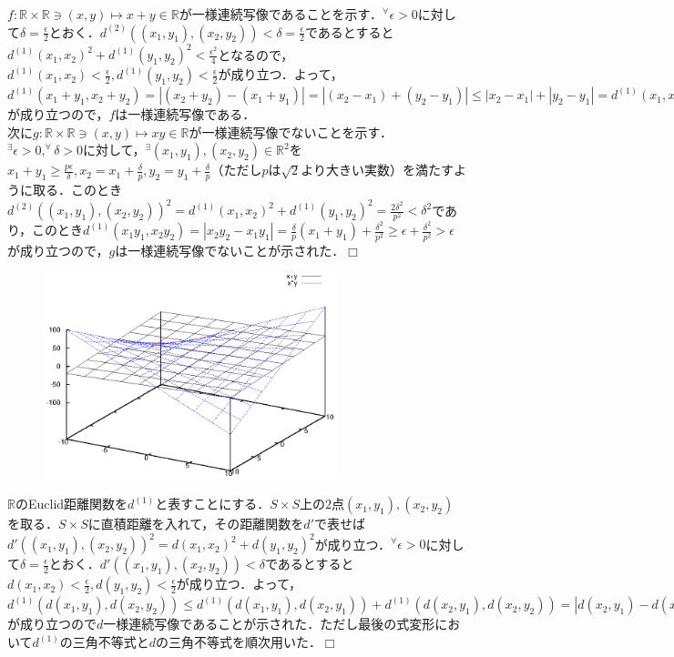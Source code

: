 ﻿\documentclass[11pt,a4paper]{jsarticle}
\def\qed{\hfill $\Box$}
\begin{document}
%
\prob
$f:\mathbb{R}\times\mathbb{R}\ni(x,y)\mapsto x+y \in \mathbb{R}$が一様連続写像であることを示す．$^\forall \epsilon>0$に対して$\delta=\frac{\epsilon}{2}$とおく．$d^{(2)}((x_1,y_1),(x_2,y_2))<\delta=\frac{\epsilon}{2}$であるとすると$d^{(1)}(x_1,x_2)^2+d^{(1)}(y_1,y_2)^2<\frac{\epsilon^2}{4}$となるので，$d^{(1)}(x_1,x_2)<\frac{\epsilon}{2},d^{(1)}(y_1,y_2)<\frac{\epsilon}{2}$が成り立つ．よって，$d^{(1)}(x_1+y_1,x_2+y_2)=|(x_2+y_2)-(x_1+y_1)|=|(x_2-x_1)+(y_2-y_1)|\leq|x_2-x_1|+|y_2-y_1|=d^{(1)}(x_1,x_2)+d^{(1)}(y_1,y_2)<\epsilon$が成り立つので，$f$は一様連続写像である．\\
次に$g:\mathbb{R}\times\mathbb{R}\ni(x,y)\mapsto xy \in \mathbb{R}$が一様連続写像でないことを示す．$^\exists \epsilon>0, ^\forall \delta>0$に対して，$^\exists (x_1,y_1),(x_2,y_2) \in \mathbb{R}^2$を$\displaystyle x_1+y_1 \geq \frac{p\epsilon}{\delta},x_2=x_1+\frac{\delta}{p},y_2=y_1+\frac{\delta}{p}$（ただし$p$は$\sqrt{2}$より大きい実数）を満たすように取る．このとき$d^{(2)}((x_1,y_1),(x_2,y_2))^2=d^{(1)}(x_1,x_2)^2+d^{(1)}(y_1,y_2)^2=\frac{2\delta^2}{p^2}<\delta^2$であり，このとき$d^{(1)}(x_1y_1,x_2y_2)=|x_2y_2-x_1y_1|=\frac{\delta}{p}(x_1+y_1)+\frac{\delta^2}{p^2} \geq \epsilon+\frac{\delta^2}{p^2}>\epsilon$
が成り立つので，$g$は一様連続写像でないことが示された．\qed
\begin{figure}[htbp]
 \begin{center}
  \includegraphics[width=85mm]{graph2.eps}
 \end{center}
\end{figure}
%
\prob
$\mathbb{R}$のEuclid距離関数を$d^{(1)}$と表すことにする．$S\times S$上の$2$点$(x_1,y_1),(x_2,y_2)$を取る．$S\times S$に直積距離を入れて，その距離関数を$d'$で表せば$d'((x_1,y_1),(x_2,y_2))^2=d(x_1,x_2)^2+d(y_1,y_2)^2$が成り立つ．$^\forall \epsilon>0$に対して$\delta=\frac{\epsilon}{2}$とおく．$d'((x_1,y_1),(x_2,y_2))<\delta$であるとすると$d(x_1,x_2)<\frac{\epsilon}{2},d(y_1,y_2)<\frac{\epsilon}{2}$が成り立つ．よって，$d^{(1)}(d(x_1,y_1),d(x_2,y_2)) \leq d^{(1)}(d(x_1,y_1),d(x_2,y_1))+d^{(1)}(d(x_2,y_1),d(x_2,y_2)) = |d(x_2,y_1)-d(x_1,y_1)|+|d(x_2,y_2)-d(x_2,y_1)| \leq d(x_1,x_2)+d(y_1,y_2) < \epsilon$が成り立つので$d$一様連続写像であることが示された．ただし最後の式変形において$d^{(1)}$の三角不等式と$d$の三角不等式を順次用いた．\qed
\end{document}
